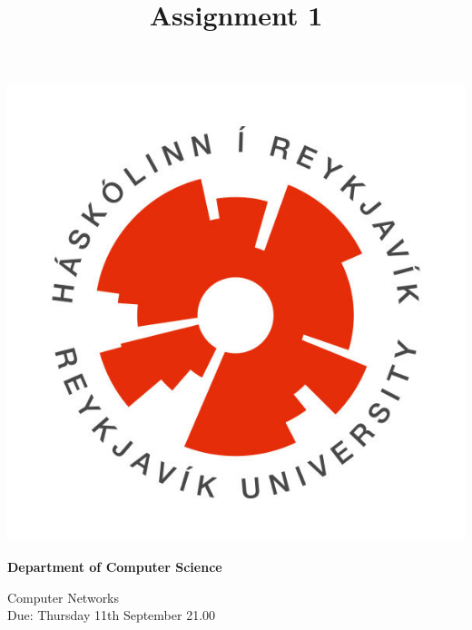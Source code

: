 \documentclass[9pt, addpoints, answers]{exam}
\title{Assignment 1}
\begin{document}
\noindent
\begin{minipage}[l]{.11\textwidth}%
\noindent
    \includegraphics[width=\textwidth]{HR}
\end{minipage}%
\begin{minipage}[r]{.6\textwidth}%
\begin{center}
    {\large\bfseries Department of Computer Science \par
    \large Computer Networks \\[2pt]
    \large Due: Thursday 11th September {21.00}
    }
\end{center}
\end{minipage}%
%
\end{document}
